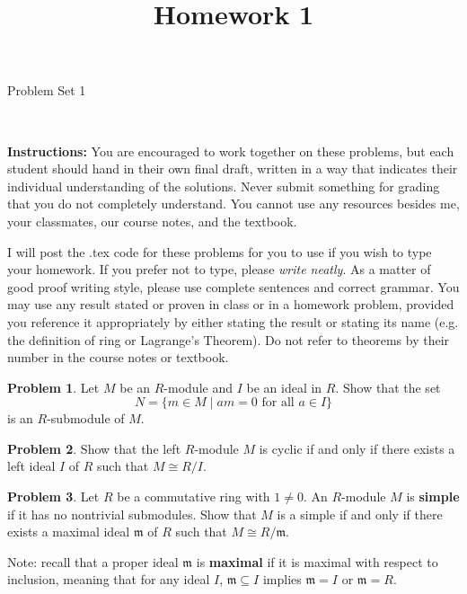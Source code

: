 \documentclass[11pt]{article}
\title{}
\date{\vspace{-0.5in}}
\title{Homework 1}
\newcommand{\m}{\mathfrak{m}}
\theoremstyle{definition}
\newtheorem{problem}{Problem}
\begin{document}
\thispagestyle{fancy}
\pagestyle{fancy}

\vspace{3em}

\begin{center}
	{\LARGE Problem Set 1}
\end{center}

\

\noindent
{\bf Instructions:}
You are encouraged to work together on these problems, but each student should hand in their own final draft, written in a way that indicates their individual understanding of the solutions. Never submit something for grading that you do not completely understand. You cannot use any resources besides me, your classmates, our course notes, and the textbook.


I will post the .tex code for these problems for you to use if you wish to type your homework. If you prefer not to type, please  {\em write neatly}. As a matter of good proof writing style, please use complete sentences and correct grammar. You may use any result  stated or proven in class or in a homework problem, provided you reference it appropriately by either stating the result or stating its name (e.g. the definition of ring or Lagrange's Theorem). Do not refer to theorems by their number in the course notes or textbook.


\vspace{2em}




\begin{problem}
Let $M$ be an $R$-module and $I$ be an ideal in $R$. Show that the set
$$N = \{ m \in M \mid am = 0 \textrm{ for all } a \in I \}$$
is an $R$-submodule of $M$.
\end{problem}




\begin{problem}
Show that the left $R$-module $M$ is cyclic if and only if there exists a left ideal $I$ of $R$ such that $M \cong R/I$.
\end{problem}




\begin{problem}
Let $R$ be a commutative ring with $1 \neq 0$. An $R$-module $M$ is {\bf simple} if it has no nontrivial submodules.
Show that $M$ is a simple if and only if there exists a maximal ideal $\m$ of $R$ such that $M \cong R/\m$.

\noindent
Note: recall that a proper ideal $\m$ is {\bf maximal} if it is maximal with respect to inclusion, meaning that for any ideal $I$, $\m \subseteq I$ implies $\m = I$ or $\m = R$.
\end{problem}
\end{document}
